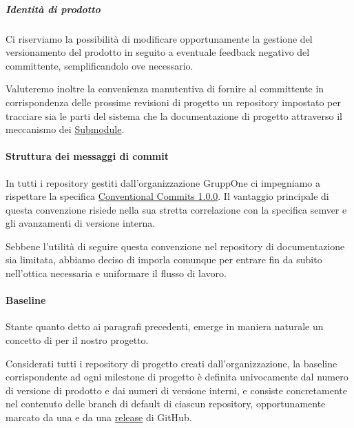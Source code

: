 \documentclass[../norme-di-progetto.tex]{subfiles}
\begin{document}
\subparagraph{Identità di prodotto}%
\label{subp:identita_di_prodotto}

Ci riserviamo la possibilità di modificare opportunamente la gestione del versionamento del prodotto in seguito a eventuale feedback negativo del committente, semplificandolo ove necessario.

Valuteremo inoltre la convenienza manutentiva di fornire al committente in corrispondenza delle prossime revisioni di progetto un repository impostato per tracciare sia le parti del sistema che la documentazione di progetto attraverso il meccanismo dei \href{https://git-scm.com/book/en/v2/Git-Tools-Submodules}{Submodule}.


\paragraph{Struttura dei messaggi di commit}%
\label{par:struttura_dei_messaggi_di_commit}

In tutti i repository gestiti dall'organizzazione GruppOne ci impegniamo a rispettare la specifica \href{https://www.conventionalcommits.org/en/v1.0.0/}{Conventional Commits 1.0.0}. Il vantaggio principale di questa convenzione risiede nella sua stretta correlazione con la specifica semver e gli avanzamenti di versione interna.

Sebbene l'utilità di seguire questa convenzione nel repository di documentazione sia limitata, abbiamo deciso di imporla comunque per entrare fin da subito nell'ottica necessaria e uniformare il flusso di lavoro.

\paragraph{Baseline}%
\label{par:baseline}

Stante quanto detto ai paragrafi precedenti, emerge in maniera naturale un concetto di  per il nostro progetto.

Considerati tutti i repository di progetto creati dall'organizzazione, la baseline corrispondente ad ogni milestone di progetto è definita univocamente dal numero di versione di prodotto e dai numeri di versione interni, e consiste concretamente nel contenuto delle branch di default di ciascun repository, opportunamente marcato da una  e da una \href{https://help.github.com/en/github/administering-a-repository/about-releases}{release} di GitHub.
\end{document}
